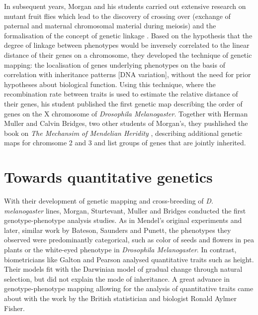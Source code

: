 In subsequent years, Morgan and his students carried out extensive research on mutant fruit flies which lead to the discovery of crossing over (exchange of paternal and maternal chromosomal material during meiosis) and the formalisation of the concept of genetic linkage \citep{Morgan1911b}. Based on the hypothesis that the degree of linkage between phenotypes would be inversely correlated to the linear distance of their genes on a chromosome, they developed the technique of genetic mapping: the localisation of genes underlying phenotypes on the basis of correlation with inheritance patterns [DNA variation], without the need for prior hypotheses about biological function. Using this technique, where the recombination rate between traits is used to estimate the relative distance of their genes, his student \citet{Sturtevant1913} published the first genetic map describing the order of genes on the X chromosome of \textit{Drosophila Melanogaster}. Together with Herman Muller and Calvin Bridges, two other students of Morgan's, they pushlished the book on \textit{The Mechansim of Mendelian Heridity} \parencite*{Morgan1915}, describing additional genetic maps for chromsome 2 and 3 and list groups of genes that are jointly inherited. 

\section{Towards quantitative genetics}
With their development of genetic mapping and cross-breeding of \textit{D. melanogaster} lines, Morgan, Sturtevant, Muller and Bridges conducted the first genotype-phenotype analysis studies. As in Mendel's original experiments and later, similar work by Bateson, Saunders and Punett, the phenotypes they observed were predominantly categorical, such as color of seeds and flowers in pea plants or the white-eyed phenotype in \textit{Drosophila Melanogaster}. In contrast, biometricians like Galton and Pearson analysed quantitative traits such as height. Their models fit with the Darwinian model of gradual change through natural selection, but did not explain the mode of inheritance.  A great advance in genotype-phenotype mapping allowing for the analysis of quantitative traits came about with the work by the British statistician and biologist Ronald Aylmer Fisher. 

